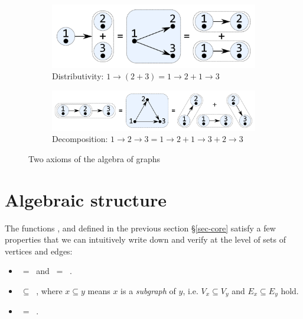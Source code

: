 \begin{figure}
\begin{subfigure}[b]{0.4\linewidth}
\centerline{\includegraphics[scale=0.27]{fig/ax-distributivity.pdf}}
\caption{Distributivity: $1 \rightarrow (2 + 3) = 1 \rightarrow 2 + 1 \rightarrow 3$ }
\end{subfigure}
\hspace{12mm}
\begin{subfigure}[b]{0.5\linewidth}
\centerline{\includegraphics[scale=0.27]{fig/ax-decomposition.pdf}}
\caption{Decomposition: $1 \rightarrow 2 \rightarrow 3 = 1 \rightarrow 2 +
1 \rightarrow 3 + 2 \rightarrow 3$}
\end{subfigure}
\caption{Two axioms of the algebra of graphs\label{fig-axioms}}
\end{figure}

\section{Algebraic structure}\label{sec-algebra}

The functions ,  and  defined in the previous
section \S\ref{sec-core} satisfy a few properties that we can intuitively write down
and verify at the level of sets of vertices and edges:
\begin{itemize}
    \item {} $\ =\ $  and
     $\ =\ $ .
    \item {} $\ \subseteq\ $ , where $x \subseteq y$ means
    $x$ is a \emph{subgraph} of $y$, i.e. $V_x\subseteq V_y$ and $E_x\subseteq E_y$ hold.
    \item {} $\ =\ $ .
\end{itemize}


